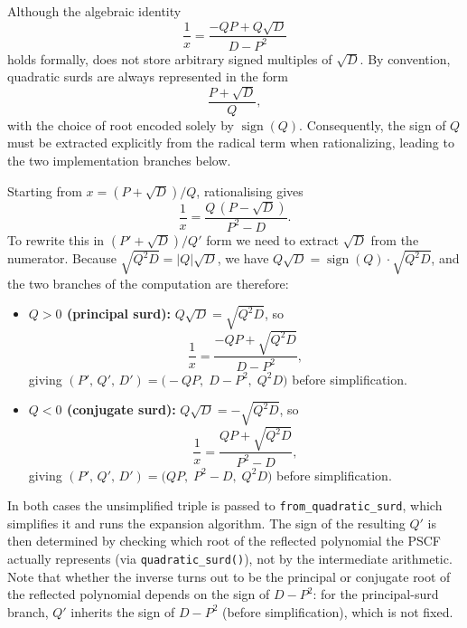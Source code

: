 \begin{remark}
  Although the algebraic identity
  \[
  \frac{1}{x}
  =
  \frac{-QP+Q\sqrt{D}}{D-P^2}
  \]
  holds formally, \catena does not store arbitrary signed multiples of
  $\sqrt D$.  By convention, quadratic surds are always represented in the
  form
  \[
  \frac{P+\sqrt D}{Q},
  \]
  with the choice of root encoded solely by $\operatorname{sign}(Q)$.
  Consequently, the sign of $Q$ must be extracted explicitly from the radical
  term when rationalizing, leading to the two implementation branches below.

  Starting from $x = (P + \sqrt{D})/Q$, rationalising gives
  \[
    \frac{1}{x} = \frac{Q\,(P - \sqrt{D})}{P^2 - D}.
  \]
  To rewrite this in $(P' + \sqrt{D})/Q'$ form we need to extract $\sqrt{D}$ from the
  numerator.  Because $\sqrt{Q^2 D} = \lvert Q\rvert \sqrt{D}$, we have
  $Q\sqrt{D} = \operatorname{sign}(Q)\cdot\sqrt{Q^2 D}$, and the two branches of the
  computation are therefore:
  \begin{itemize}
    \item \textbf{$Q > 0$ (principal surd):}\quad
          $Q\sqrt{D} = \sqrt{Q^2 D}$, so
          \[
            \frac{1}{x} = \frac{-QP + \sqrt{Q^2 D}}{D - P^2},
          \]
          giving $(P',\, Q',\, D') = \bigl(-QP,\; D - P^2,\; Q^2 D\bigr)$ before simplification.

    \item \textbf{$Q < 0$ (conjugate surd):}\quad
          $Q\sqrt{D} = -\sqrt{Q^2 D}$, so
          \[
            \frac{1}{x} = \frac{QP + \sqrt{Q^2 D}}{P^2 - D},
          \]
          giving $(P',\, Q',\, D') = \bigl(QP,\; P^2 - D,\; Q^2 D\bigr)$ before simplification.
  \end{itemize}
  In both cases the unsimplified triple is passed to \texttt{from\_quadratic\_surd}, which
  simplifies it and runs the expansion algorithm.  The sign of the resulting $Q'$ is then
  determined by checking which root of the reflected polynomial the PSCF actually represents
  (via \texttt{quadratic\_surd()}), not by the intermediate arithmetic.
  Note that whether the inverse turns out to be the principal or conjugate root of the
  reflected polynomial depends on the sign of $D - P^2$: for the principal-surd branch,
  $Q'$ inherits the sign of $D - P^2$ (before simplification), which is not fixed.
\end{remark}

